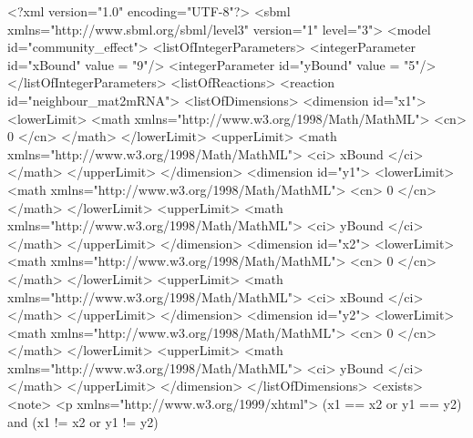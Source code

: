 \documentclass{cekarticle}
\begin{document}
\begin{example}
<?xml version="1.0" encoding="UTF-8"?>
<sbml xmlns="http://www.sbml.org/sbml/level3" version="1" level="3">
<model id="community_effect">
    <listOfIntegerParameters>
        <integerParameter id="xBound" value = "9"/>
        <integerParameter id="yBound" value = "5"/>
    </listOfIntegerParameters>
    <listOfReactions>
        <reaction id="neighbour_mat2mRNA">
            <listOfDimensions>
                <dimension id="x1">
                    <lowerLimit>
                        <math xmlns="http://www.w3.org/1998/Math/MathML">
                            <cn> 0 </cn>
                        </math>
                    </lowerLimit>
                    <upperLimit>
                        <math xmlns="http://www.w3.org/1998/Math/MathML">
                            <ci> xBound </ci>
                        </math>
                    </upperLimit>
                </dimension>
                <dimension id="y1">
                    <lowerLimit>
                        <math xmlns="http://www.w3.org/1998/Math/MathML">
                            <cn> 0 </cn>
                        </math>
                    </lowerLimit>
                    <upperLimit>
                        <math xmlns="http://www.w3.org/1998/Math/MathML">
                            <ci> yBound </ci>
                        </math>
                    </upperLimit>
                </dimension>
                <dimension id="x2">
                    <lowerLimit>
                        <math xmlns="http://www.w3.org/1998/Math/MathML">
                            <cn> 0 </cn>
                        </math>
                    </lowerLimit>
                    <upperLimit>
                        <math xmlns="http://www.w3.org/1998/Math/MathML">
                            <ci> xBound </ci>
                        </math>
                    </upperLimit>
                </dimension>
                <dimension id="y2">
                    <lowerLimit>
                        <math xmlns="http://www.w3.org/1998/Math/MathML">
                            <cn> 0 </cn>
                        </math>
                    </lowerLimit>
                    <upperLimit>
                        <math xmlns="http://www.w3.org/1998/Math/MathML">
                            <ci> yBound </ci>
                        </math>
                    </upperLimit>
                </dimension>
            </listOfDimensions>
            <exists>
                <note>
                    <p xmlns="http://www.w3.org/1999/xhtml">
                        (x1 == x2 or y1 == y2) and (x1 != x2 or y1 != y2)

\end{example}
\end{document}
